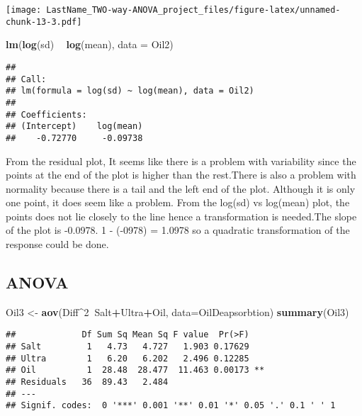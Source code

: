 \documentclass[]{article}
\newenvironment{Shaded}{\begin{snugshade}}{\end{snugshade}}
\newcommand{\DataTypeTok}[1]{\textcolor[rgb]{0.13,0.29,0.53}{#1}}
\newcommand{\DecValTok}[1]{\textcolor[rgb]{0.00,0.00,0.81}{#1}}
\newcommand{\KeywordTok}[1]{\textcolor[rgb]{0.13,0.29,0.53}{\textbf{#1}}}
\newcommand{\NormalTok}[1]{#1}
\newcommand{\OperatorTok}[1]{\textcolor[rgb]{0.81,0.36,0.00}{\textbf{#1}}}
\newcommand{\StringTok}[1]{\textcolor[rgb]{0.31,0.60,0.02}{#1}}
\begin{document}
\texttt{[image: LastName\_TWO-way-ANOVA\_project\_files/figure-latex/unnamed-chunk-13-3.pdf]}

\begin{Shaded}
\begin{Highlighting}[]
\KeywordTok{lm}\NormalTok{(}\KeywordTok{log}\NormalTok{(sd) }\OperatorTok{~}\StringTok{ }\KeywordTok{log}\NormalTok{(mean), }\DataTypeTok{data =}\NormalTok{ Oil2)}
\end{Highlighting}
\end{Shaded}

\begin{verbatim}
## 
## Call:
## lm(formula = log(sd) ~ log(mean), data = Oil2)
## 
## Coefficients:
## (Intercept)    log(mean)  
##    -0.72770     -0.09738
\end{verbatim}

From the residual plot, It seems like there is a problem with
variability since the points at the end of the plot is higher than the
rest.There is also a problem with normality because there is a tail and
the left end of the plot. Although it is only one point, it does seem
like a problem. From the log(sd) vs log(mean) plot, the points does not
lie closely to the line hence a transformation is needed.The slope of
the plot is -0.0978. 1 - (-0978) = 1.0978 so a quadratic transformation
of the response could be done.

\hypertarget{anova-2}{%
\subsection{ANOVA}\label{anova-2}}

\begin{Shaded}
\begin{Highlighting}[]
\NormalTok{Oil3 <-}\StringTok{ }\KeywordTok{aov}\NormalTok{(Diff}\OperatorTok{^}\DecValTok{2}\OperatorTok{~}\NormalTok{Salt}\OperatorTok{+}\NormalTok{Ultra}\OperatorTok{+}\NormalTok{Oil, }\DataTypeTok{data=}\NormalTok{OilDeapsorbtion)}
\KeywordTok{summary}\NormalTok{(Oil3)}
\end{Highlighting}
\end{Shaded}

\begin{verbatim}
##             Df Sum Sq Mean Sq F value  Pr(>F)   
## Salt         1   4.73   4.727   1.903 0.17629   
## Ultra        1   6.20   6.202   2.496 0.12285   
## Oil          1  28.48  28.477  11.463 0.00173 **
## Residuals   36  89.43   2.484                   
## ---
## Signif. codes:  0 '***' 0.001 '**' 0.01 '*' 0.05 '.' 0.1 ' ' 1
\end{verbatim}
\end{document}
